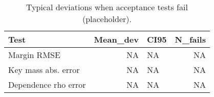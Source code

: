 \begin{table}

\caption{\label{tab:unnamed-chunk-1}Typical deviations when acceptance tests fail (placeholder).}
\centering
\begin{tabular}[t]{lrlr}
\toprule
Test & Mean\_dev & CI95 & N\_fails\\
\midrule
Margin RMSE & NA & NA & NA\\
Key mass abs. error & NA & NA & NA\\
Dependence rho error & NA & NA & NA\\
\bottomrule
\end{tabular}
\end{table}
